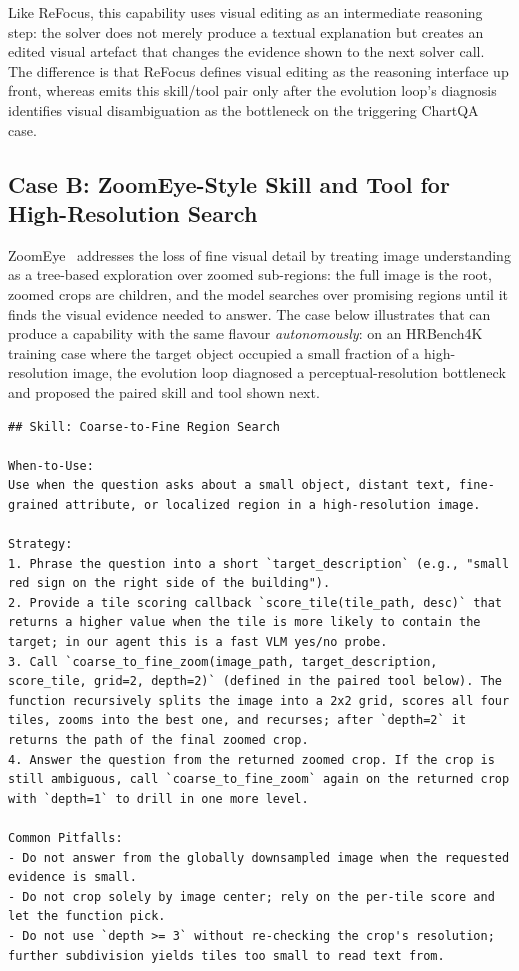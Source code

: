 Like ReFocus, this capability uses visual editing as an intermediate reasoning step: the
solver does not merely produce a textual explanation but creates an edited visual
artefact that changes the evidence shown to the next solver call. The difference is that
ReFocus defines visual editing as the reasoning interface up front, whereas \sysname{}
emits this skill/tool pair only after the evolution loop's diagnosis identifies visual
disambiguation as the bottleneck on the triggering ChartQA case.

\subsection{Case B: ZoomEye-Style Skill and Tool for High-Resolution Search}
\label{app:zoomeye_style}

ZoomEye~\citep{DBLP:conf/emnlp/ShenZZXZZY25} addresses the loss of fine visual detail by
treating image understanding as a tree-based exploration over zoomed sub-regions: the
full image is the root, zoomed crops are children, and the model searches over promising
regions until it finds the visual evidence needed to answer. The case below illustrates
that \sysname{} can produce a capability with the same flavour \emph{autonomously}: on
an HRBench4K training case where the target object occupied a small fraction of a
high-resolution image, the evolution loop diagnosed a perceptual-resolution bottleneck
and proposed the paired skill and tool shown next.

\begin{tcolorbox}[
    title={\textbf{Generated skill (paired with the tool below; triggered on HRBench4K)}},
    casebox
]
\begin{lstlisting}[style=mdskill]
## Skill: Coarse-to-Fine Region Search

When-to-Use:
Use when the question asks about a small object, distant text, fine-grained attribute, or localized region in a high-resolution image.

Strategy:
1. Phrase the question into a short `target_description` (e.g., "small red sign on the right side of the building").
2. Provide a tile scoring callback `score_tile(tile_path, desc)` that returns a higher value when the tile is more likely to contain the target; in our agent this is a fast VLM yes/no probe.
3. Call `coarse_to_fine_zoom(image_path, target_description, score_tile, grid=2, depth=2)` (defined in the paired tool below). The function recursively splits the image into a 2x2 grid, scores all four tiles, zooms into the best one, and recurses; after `depth=2` it returns the path of the final zoomed crop.
4. Answer the question from the returned zoomed crop. If the crop is still ambiguous, call `coarse_to_fine_zoom` again on the returned crop with `depth=1` to drill in one more level.

Common Pitfalls:
- Do not answer from the globally downsampled image when the requested evidence is small.
- Do not crop solely by image center; rely on the per-tile score and let the function pick.
- Do not use `depth >= 3` without re-checking the crop's resolution; further subdivision yields tiles too small to read text from.
\end{lstlisting}
\end{tcolorbox}

